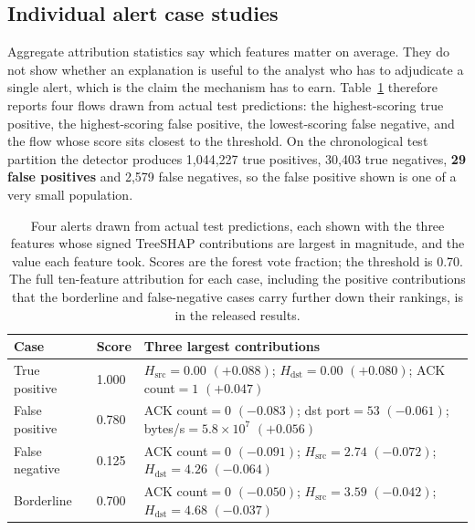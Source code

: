 \documentclass{ieeeaccess}
\begin{document}
\subsection{Individual alert case studies}
\label{sec:cases}
Aggregate attribution statistics say which features matter on average. They do
not show whether an explanation is useful to the analyst who has to adjudicate a
single alert, which is the claim the mechanism has to earn.
Table~\ref{tab:cases} therefore reports four flows drawn from actual test
predictions: the highest-scoring true positive, the highest-scoring false
positive, the lowest-scoring false negative, and the flow whose score sits
closest to the threshold. On the chronological test partition the detector
produces 1,044,227 true positives, 30,403 true negatives, \textbf{29 false
positives} and 2,579 false negatives, so the false positive shown is one of a
very small population.

\begin{table}[!t]
\caption{Four alerts drawn from actual test predictions, each shown with the
three features whose signed TreeSHAP contributions are largest in magnitude, and
the value each feature took. Scores are the forest vote fraction; the threshold
is 0.70. The full ten-feature attribution for each case, including the positive
contributions that the borderline and false-negative cases carry further down
their rankings, is in the released results.}
\centering
\label{tab:cases}
\footnotesize
\setlength{\tabcolsep}{3pt}
\renewcommand{\arraystretch}{1.2}
\begin{tabular}{@{}llp{4.9cm}@{}}
\toprule
\textbf{Case} & \textbf{Score} & \textbf{Three largest contributions} \\
\midrule
True positive  & 1.000 & $H_{\mathrm{src}}{=}0.00$ $(+0.088)$;
                         $H_{\mathrm{dst}}{=}0.00$ $(+0.080)$;
                         ACK count${=}1$ $(+0.047)$ \\
False positive & 0.780 & ACK count${=}0$ $(-0.083)$;
                         dst port${=}53$ $(-0.061)$;
                         bytes/s${=}5.8{\times}10^{7}$ $(+0.056)$ \\
False negative & 0.125 & ACK count${=}0$ $(-0.091)$;
                         $H_{\mathrm{src}}{=}2.74$ $(-0.072)$;
                         $H_{\mathrm{dst}}{=}4.26$ $(-0.064)$ \\
Borderline     & 0.700 & ACK count${=}0$ $(-0.050)$;
                         $H_{\mathrm{src}}{=}3.59$ $(-0.042)$;
                         $H_{\mathrm{dst}}{=}4.68$ $(-0.037)$ \\
\bottomrule
\end{tabular}
\end{table}
\end{document}
